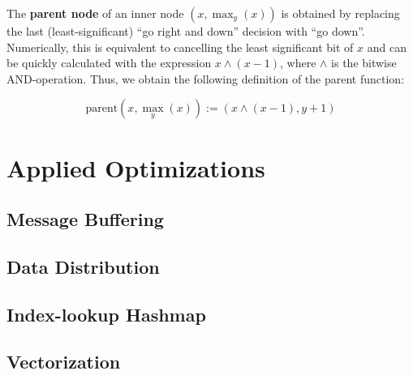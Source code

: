 The \textbf{parent node} of an inner node $(x, \max_y(x))$ is obtained by replacing the last (least-significant) \enquote{go right and down} decision
with \enquote{go down}. Numerically, this is equivalent to cancelling the least significant bit of $x$ and can be quickly calculated with the
expression $x \wedge (x - 1)$, where $\wedge$ is the bitwise AND-operation. Thus, we obtain the following definition of the parent function:

\begin{equation}
\label{eq:parent}
\textrm{parent} (x, \max_y (x) ) := (x \wedge (x - 1), y + 1)
\end{equation}

\section{Applied Optimizations}
\label{sec:AppliedOptimizations}

\subsection{Message Buffering}
\label{sec:MessageBuffering}

\subsection{Data Distribution}
\label{sec:DataDistribution}

\subsection{Index-lookup Hashmap}
\label{sec:IndexLookupHashmap}

\subsection{Vectorization}
\label{sec:Vectorization}